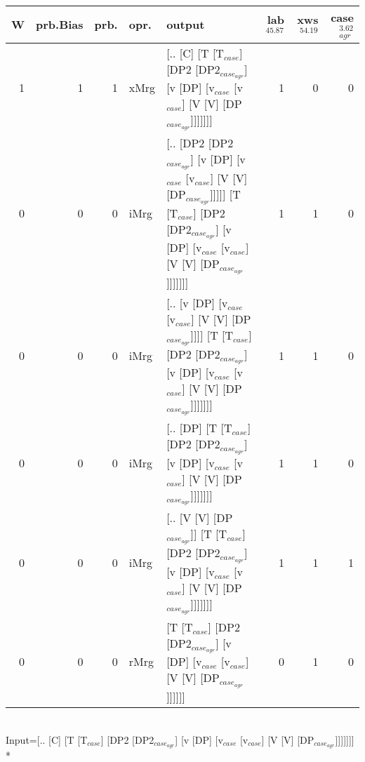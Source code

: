 \begin{tabularx}{\linewidth}{rrrlXrrr}
\hline
   W &   prb.Bias &   prb. & opr.   & output                                                                                                                                                        &   lab$^{45.87}$ &   xws$^{54.19}$ &   case$_{agr}^{3.62}$ \\
\hline
   1 &       1 &   1 & xMrg & [.. [C] [T [T$_{case}$] [DP2 [DP2$_{case_{agr}}$] [v [DP] [v$_{case}$ [v$_{case}$] [V [V] [DP$_{case_{agr}}$]]]]]]]                                                                   &             1 &             0 &                  0 \\
   0 &       0 &   0 & iMrg & [.. [DP2 [DP2$_{case_{agr}}$] [v [DP] [v$_{case}$ [v$_{case}$] [V [V] [DP$_{case_{agr}}$]]]]] [T [T$_{case}$] [DP2 [DP2$_{case_{agr}}$] [v [DP] [v$_{case}$ [v$_{case}$] [V [V] [DP$_{case_{agr}}$]]]]]]] &             1 &             1 &                  0 \\
   0 &       0 &   0 & iMrg & [.. [v [DP] [v$_{case}$ [v$_{case}$] [V [V] [DP$_{case_{agr}}$]]]] [T [T$_{case}$] [DP2 [DP2$_{case_{agr}}$] [v [DP] [v$_{case}$ [v$_{case}$] [V [V] [DP$_{case_{agr}}$]]]]]]]                      &             1 &             1 &                  0 \\
   0 &       0 &   0 & iMrg & [.. [DP] [T [T$_{case}$] [DP2 [DP2$_{case_{agr}}$] [v [DP] [v$_{case}$ [v$_{case}$] [V [V] [DP$_{case_{agr}}$]]]]]]]                                                                  &             1 &             1 &                  0 \\
   0 &       0 &   0 & iMrg & [.. [V [V] [DP$_{case_{agr}}$]] [T [T$_{case}$] [DP2 [DP2$_{case_{agr}}$] [v [DP] [v$_{case}$ [v$_{case}$] [V [V] [DP$_{case_{agr}}$]]]]]]]                                                 &             1 &             1 &                  1 \\
   0 &       0 &   0 & rMrg & [T [T$_{case}$] [DP2 [DP2$_{case_{agr}}$] [v [DP] [v$_{case}$ [v$_{case}$] [V [V] [DP$_{case_{agr}}$]]]]]]                                                                            &             0 &             1 &                  0 \\
\hline
\end{tabularx}\endgroup\\
\begingroup\scriptsize Input=[.. [C] [T [T$_{case}$] [DP2 [DP2$_{case_{agr}}$] [v [DP] [v$_{case}$ [v$_{case}$] [V [V] [DP$_{case_{agr}}$]]]]]]]\\*

